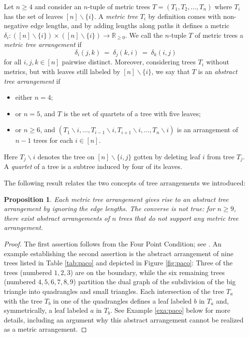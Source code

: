 \documentclass[12pt,a4paper]{amsart}
\newtheorem{prop}[thm]{Proposition}
\theoremstyle{definition}
\newcommand{\R}{{\mathbb{R}}}
\begin{document}
Let $n \ge 4$ and consider an $n$-tuple of metric trees
$T=(T_1,T_2,\dots,T_n)$ where $T_i$ has the set of leaves
$[n]\backslash\{i\}$.  A \emph{metric tree} $T_i$ by definition comes
with non-negative edge lengths, and by adding lengths along paths it
defines a metric
$\delta_i:([n]\backslash\{i\})\times([n]\backslash\{i\})\to\R_{\ge
  0}$.  We call the $n$-tuple $T$ of metric trees a \emph{metric tree
  arrangement} if
\begin{equation}\label{eq:metric_tree}
  \delta_i(j,k) \ = \ \delta_j(k,i) \ = \ \delta_k(i,j)
\end{equation}
for all $i,j,k\in[n]$ pairwise distinct.  Moreover, considering 
trees $T_i$ without metrics, but with leaves
still labeled by $[n]\backslash \{i\}$,
we say that $T$ 
is an \emph{abstract tree arrangement} if 
\begin{itemize}
\item either $n=4$;
\item or $n=5$, and $T$ is the set of quartets of a tree with five leaves;
\item or $n \ge 6$, and $(T_1\backslash i,\dots,T_{i-1}\backslash
  i,T_{i+1}\backslash i,\dots,T_n\backslash i)$ is an arrangement of
  $n-1$ trees for each $i\in[n]$.
\end{itemize}
Here $T_j\backslash i$ denotes the tree on $[n]\backslash\{i,j\}$
gotten by deleting leaf $i$ from tree $T_j$. 
A \emph{quartet} of a tree is a subtree induced by four of its leaves.

The following result relates the two concepts of tree arrangements we
introduced:

\begin{prop}
  Each metric tree arrangement gives rise to an abstract tree
  arrangement by ignoring the edge lengths. The converse is not true:
  for $n \geq 9$, there exist abstract arrangements of $n$ trees that
  do not support any metric tree arrangement.
\end{prop}

\begin{proof} The first assertion follows from the Four Point Condition; see
  \cite[Theorem 2.36]{ASCB}. An example establishing the second assertion is
  the abstract arrangement of nine trees listed in Table \ref{tab:paco} and
  depicted in Figure \ref{fig:paco}: Three of the trees (numbered $1,2,3$) are
  on the boundary, while the six remaining trees (numbered $4,5,6,7,8,9$)
  partition the dual graph of the subdivision of the big triangle into
  quadrangles and small triangles.  Each intersection of the tree $T_a$ with
  the tree $T_b$ in one of the quadrangles defines a leaf labeled $b$ in $T_a$
  and, symmetrically, a leaf labeled $a$ in $T_b$.  See Example \ref{exa:paco}
  below for more details, including an argument why this abstract arrangement
  cannot be realized as a metric arrangement.
\end{proof}
\end{document}
